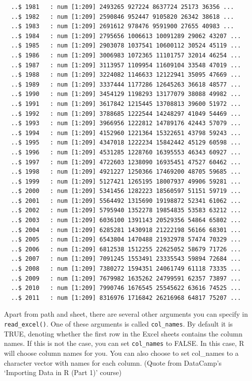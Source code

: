 \documentclass[
]{book}
\begin{document}
\begin{verbatim}
  ..$ 1981   : num [1:209] 2493265 927224 8637724 25173 36356 ...
  ..$ 1982   : num [1:209] 2590846 952447 9105820 26342 38618 ...
  ..$ 1983   : num [1:209] 2691612 978476 9591900 27655 40983 ...
  ..$ 1984   : num [1:209] 2795656 1006613 10091289 29062 43207 ...
  ..$ 1985   : num [1:209] 2903078 1037541 10600112 30524 45119 ...
  ..$ 1986   : num [1:209] 3006983 1072365 11101757 32014 46254 ...
  ..$ 1987   : num [1:209] 3113957 1109954 11609104 33548 47019 ...
  ..$ 1988   : num [1:209] 3224082 1146633 12122941 35095 47669 ...
  ..$ 1989   : num [1:209] 3337444 1177286 12645263 36618 48577 ...
  ..$ 1990   : num [1:209] 3454129 1198293 13177079 38088 49982 ...
  ..$ 1991   : num [1:209] 3617842 1215445 13708813 39600 51972 ...
  ..$ 1992   : num [1:209] 3788685 1222544 14248297 41049 54469 ...
  ..$ 1993   : num [1:209] 3966956 1222812 14789176 42443 57079 ...
  ..$ 1994   : num [1:209] 4152960 1221364 15322651 43798 59243 ...
  ..$ 1995   : num [1:209] 4347018 1222234 15842442 45129 60598 ...
  ..$ 1996   : num [1:209] 4531285 1228760 16395553 46343 60927 ...
  ..$ 1997   : num [1:209] 4722603 1238090 16935451 47527 60462 ...
  ..$ 1998   : num [1:209] 4921227 1250366 17469200 48705 59685 ...
  ..$ 1999   : num [1:209] 5127421 1265195 18007937 49906 59281 ...
  ..$ 2000   : num [1:209] 5341456 1282223 18560597 51151 59719 ...
  ..$ 2001   : num [1:209] 5564492 1315690 19198872 52341 61062 ...
  ..$ 2002   : num [1:209] 5795940 1352278 19854835 53583 63212 ...
  ..$ 2003   : num [1:209] 6036100 1391143 20529356 54864 65802 ...
  ..$ 2004   : num [1:209] 6285281 1430918 21222198 56166 68301 ...
  ..$ 2005   : num [1:209] 6543804 1470488 21932978 57474 70329 ...
  ..$ 2006   : num [1:209] 6812538 1512255 22625052 58679 71726 ...
  ..$ 2007   : num [1:209] 7091245 1553491 23335543 59894 72684 ...
  ..$ 2008   : num [1:209] 7380272 1594351 24061749 61118 73335 ...
  ..$ 2009   : num [1:209] 7679982 1635262 24799591 62357 73897 ...
  ..$ 2010   : num [1:209] 7990746 1676545 25545622 63616 74525 ...
  ..$ 2011   : num [1:209] 8316976 1716842 26216968 64817 75207 ...
\end{verbatim}

Apart from path and sheet, there are several other arguments you can specify in \texttt{read\_excel()}. One of these arguments is called \texttt{col\_names}. By default it is TRUE, denoting whether the first row in the Excel sheets contains the column names. If this is not the case, you can set \texttt{col\_names} to FALSE. In this case, R will choose column names for you. You can also choose to set col\_names to a character vector with names for each column. (Quote from DataCamp's `Importing Data in R (Part 1)' course)
\end{document}
